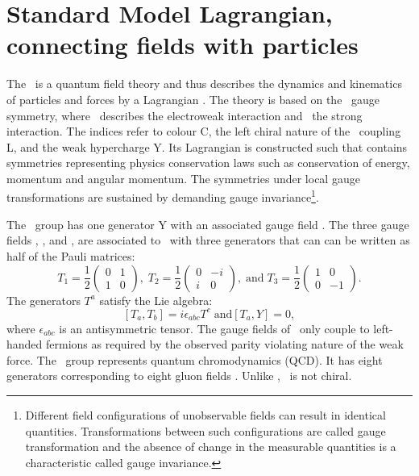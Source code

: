 \section{Standard Model Lagrangian, connecting fields with particles}
\label{sec:SMlagr}
The \SM\ is a quantum field theory and thus describes the dynamics and kinematics of particles and forces by a Lagrangian \Lagr. The theory is based on the \SSU\ gauge symmetry, where \SU\ describes the electroweak interaction and \Sthree\ the strong interaction. The indices refer to colour C, the left chiral nature of the \Stwo\ coupling L, and the weak hypercharge Y. Its Lagrangian is constructed such that contains symmetries representing physics conservation laws such as conservation of energy, momentum and angular momentum. The symmetries under local gauge transformations are sustained by demanding gauge invariance\footnote{Different field configurations of unobservable fields can result in identical quantities. Transformations between such configurations are called gauge transformation and the absence of change in the measurable quantities is a characteristic called gauge invariance.}.  



The \Uone\ group has one generator Y with an associated gauge field \Bfield. The three gauge fields \Wfieldone, \Wfieldtwo, and \Wfieldthree, are associated to \Stwo\ with three generators that can can  be written as half of the Pauli matrices: 
\begin{equation}
T_1 =  \frac{1}{2}
\begin{pmatrix}
0  &  1      \\
1  & 0      
\end{pmatrix}, \;
T_2= \frac{1}{2}
\begin{pmatrix}
0  &  -i     \\
i  &  0      
\end{pmatrix},\;\mathrm{ and } \;
 T_3= \frac{1}{2}
 \begin{pmatrix}
 1  &  0     \\
 0  &  -1 
 \end{pmatrix}.
 \label{eq:Stwee}
\end{equation}
The generators $T^a$ satisfy the Lie algebra: 
\begin{equation}
 \left[T_a,T_b\right] = i \epsilon_{abc} T^c \; \mathrm{ and } \left[T_a, Y\right] = 0, 
\end{equation}
where $\epsilon_{abc}$ is an antisymmetric tensor. The gauge fields of \Stwo\ only couple to left-handed fermions as required by the observed parity violating nature of the weak force. The \Sthree\ group represents quantum chromodynamics (QCD). It  has eight generators corresponding to eight gluon fields \Gfields. Unlike \SU, \Sthree\ is not chiral. 

